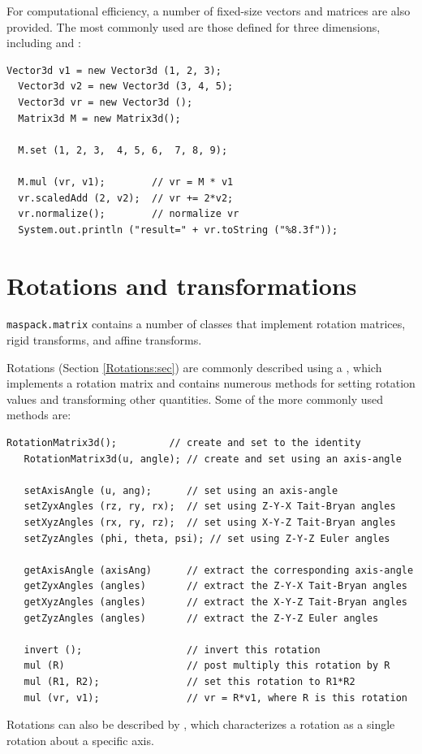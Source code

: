 For computational efficiency, a number of fixed-size vectors and
matrices are also provided. The most commonly used are those defined
for three dimensions, including 
and :
%
\begin{lstlisting}[]
  Vector3d v1 = new Vector3d (1, 2, 3);
  Vector3d v2 = new Vector3d (3, 4, 5);
  Vector3d vr = new Vector3d ();
  Matrix3d M = new Matrix3d();

  M.set (1, 2, 3,  4, 5, 6,  7, 8, 9);

  M.mul (vr, v1);        // vr = M * v1
  vr.scaledAdd (2, v2);  // vr += 2*v2;
  vr.normalize();        // normalize vr
  System.out.println ("result=" + vr.toString ("%8.3f"));
\end{lstlisting}
%

\section{Rotations and transformations}
\label{RigidTransform3d:sec}

{\tt maspack.matrix} contains a number of classes that implement rotation
matrices, rigid transforms, and affine transforms. 

Rotations (Section \ref{Rotations:sec}) are commonly described using a
, which implements a
rotation matrix and contains numerous methods for setting rotation
values and transforming other quantities. Some of the more commonly
used methods are:
\begin{lstlisting}[]
   RotationMatrix3d();         // create and set to the identity
   RotationMatrix3d(u, angle); // create and set using an axis-angle

   setAxisAngle (u, ang);      // set using an axis-angle
   setZyxAngles (rz, ry, rx);  // set using Z-Y-X Tait-Bryan angles
   setXyzAngles (rx, ry, rz);  // set using X-Y-Z Tait-Bryan angles
   setZyzAngles (phi, theta, psi); // set using Z-Y-Z Euler angles

   getAxisAngle (axisAng)      // extract the corresponding axis-angle
   getZyxAngles (angles)       // extract the Z-Y-X Tait-Bryan angles
   getXyzAngles (angles)       // extract the X-Y-Z Tait-Bryan angles
   getZyzAngles (angles)       // extract the Z-Y-Z Euler angles

   invert ();                  // invert this rotation
   mul (R)                     // post multiply this rotation by R
   mul (R1, R2);               // set this rotation to R1*R2
   mul (vr, v1);               // vr = R*v1, where R is this rotation
\end{lstlisting}
%
Rotations can also be described by
, which characterizes a rotation
as a single rotation about a specific axis.

